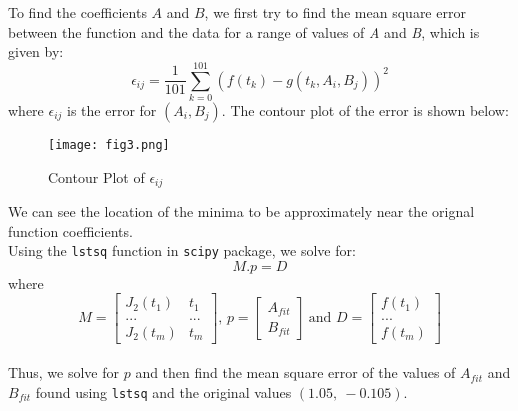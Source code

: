 \documentclass[11pt, a4paper]{article}
\begin{document}
            To find the coefficients $A$ and $B$, we first try to find the mean square error between the function and the data for a range of values of \textit{A} and \textit{B}, which is given by:
            \begin{equation}
                \epsilon_{ij} = \frac{1}{101}\sum_{k=0}^{101}(f(t_k) - g(t_k, A_i, B_j))^2
            \end{equation}
            where $\epsilon_{ij}$ is the error for $(A_i,B_j)$. The contour plot of the error is shown below:
            \begin{figure}[H]
                \centering
                \texttt{[image: fig3.png]}  %
                \caption{Contour Plot of $\epsilon_{ij}$}
                \label{fig:contourPlot}
            \end{figure}

            We can see the location of the minima to be approximately near the orignal function coefficients.\\

            Using the \texttt{lstsq} function in \texttt{scipy} package, we solve for:
            \begin{equation}
            M.p = D \label{eq5}
            \end{equation}
            where
            \begin{equation}
            M=\left[\begin{matrix}
            J_2(t_1)&t_1\\
            ...&...\\
            J_2(t_m)&t_m
            \end{matrix}\right]\text{, }p=\left[\begin{matrix}
            A_{fit}\\B_{fit}
            \end{matrix}\right]\ \text{and }D=\left[\begin{matrix}f(t_1)\\...\\f(t_m)\end{matrix}\right]
            \end{equation}\\

            Thus, we solve for $p$ and then find the mean square error of the values of $A_{fit}$ and $B_{fit}$ found using \texttt{lstsq} and the original values $(1.05,\ -0.105)$.
\end{document}
